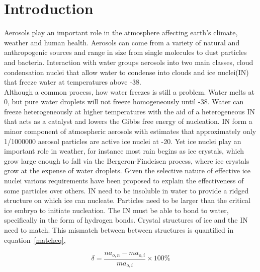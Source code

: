 \documentclass[titlepage]{article}
\begin{document}

\large
\justifying
\doublespacing

\section{Introduction}
Aerosols play an important role in the atmosphere affecting earth's climate, weather and human health.  Aerosols can come from a variety of natural and anthropogenic sources and range in size from single molecules to dust particles and bacteria\cite{SP06}.  Interaction with water groups aerosols  into two main classes, cloud condensation nuclei that allow water to condense into clouds and ice nuclei(IN) that freeze water at temperatures above -38\celsius.  \\
\indent Although  a common process, how water freezes is still a problem\cite{BR13}.  Water melts at 0\celsius, but pure water droplets will not freeze homogeneously until -38\celsius\cite{BR12}.  Water can freeze heterogeneously at higher temperatures with the aid of a heterogeneous IN\cite{SP06} that acts as a catalyst and lowers the Gibbs free energy of nucleation.  IN form a minor component of atmospheric aerosols with estimates that approximately only 1/1000000 aerosol particles are active ice nuclei at -20\celsius.  Yet ice nuclei play an important role in weather, for instance most rain begins as ice crystals, which grow large enough to fall via the Bergeron-Findeisen process, where ice crystals grow at the expense of water droplets.  Given the selective nature of effective ice nuclei various requirements have been proposed to explain the effectiveness of some particles over others.  IN need to be insoluble in water to provide a ridged structure on which ice can nucleate\cite{PK10}.  Particles need to  be larger than the critical ice embryo to initiate nucleation.  The IN must be able to bond to water, specifically in the form of hydrogen bonds.  Crystal structures of ice and the IN need to match.  This mismatch between between structures is quantified in equation~\ref{matcheq},

\begin{equation}
\delta=\frac{na_{o,n}-ma_{o,i}}{ma_{o,i}}\times 100\%
\label{matcheq}
\end{equation}
\end{document}
